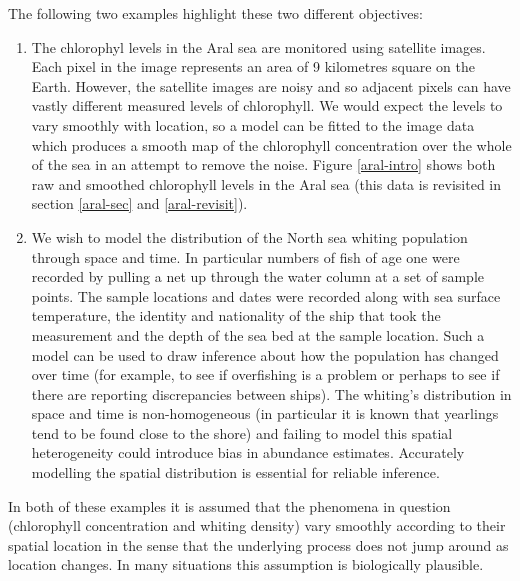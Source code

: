 The following two examples highlight these two different objectives:
\begin{enumerate}
\item The chlorophyl levels in the Aral sea are monitored using satellite images. Each pixel in the image represents an area of 9 kilometres square on the Earth. However, the satellite images are noisy and so adjacent pixels can have vastly different measured levels of chlorophyll. We would expect the levels to vary smoothly with location, so a model can be fitted to the image data which produces a smooth map of the chlorophyll concentration over the whole of the sea in an attempt to remove the noise. Figure \ref{aral-intro} shows both raw and smoothed chlorophyll levels in the Aral sea (this data is revisited in section \ref{aral-sec} and \ref{aral-revisit}).
\item We wish to model the distribution of the North sea whiting population through space and time. In particular numbers of fish of age one were recorded by pulling a net up through the water column at a set of sample points. The sample locations and dates were recorded along with sea surface temperature, the identity and nationality of the ship that took the measurement and the depth of the sea bed at the sample location. Such a model can be used to draw inference about how the population has changed over time (for example, to see if overfishing is a problem or perhaps to see if there are reporting discrepancies between ships). The whiting's distribution in space and time is non-homogeneous (in particular it is known that yearlings tend to be found close to the shore) and failing to model this spatial heterogeneity could introduce  bias in abundance estimates. Accurately modelling the spatial distribution is essential for reliable inference.
\end{enumerate}
In both of these examples it is assumed that the phenomena in question (chlorophyll concentration and whiting density) vary smoothly according to their spatial location in the sense that the underlying process does not jump around as location changes. In many situations this assumption is biologically plausible.

